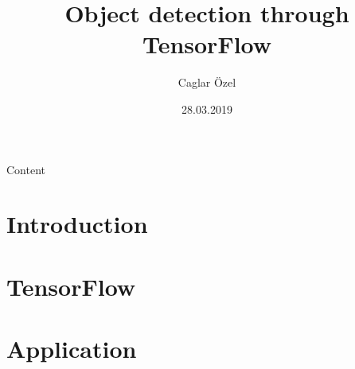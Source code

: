 \documentclass[11pt]{beamer}
\title[]{Object detection through TensorFlow}
\author{Caglar Özel}
\institute{HTW Berlin}
\date{28.03.2019}
\begin{document}
\begin{frame}
    \titlepage
\end{frame}

\begin{frame}{Content}
    \tableofcontents
\end{frame}

\section{Introduction}


\section{TensorFlow}


\section{Application}

\end{document}
